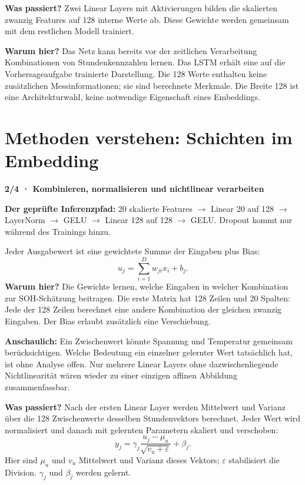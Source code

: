 \textbf{Was passiert?} Zwei Linear Layers mit Aktivierungen bilden die skalierten zwanzig Features auf 128 interne Werte ab. Diese Gewichte werden gemeinsam mit dem restlichen Modell trainiert.

\textbf{Warum hier?} Das Netz kann bereits vor der zeitlichen Verarbeitung Kombinationen von Stundenkennzahlen lernen. Das LSTM erhält eine auf die Vorhersageaufgabe trainierte Darstellung. Die 128 Werte enthalten keine zusätzlichen Messinformationen; sie sind berechnete Merkmale. Die Breite 128 ist eine Architekturwahl, keine notwendige Eigenschaft eines Embeddings.

\clearpage
\section*{\color{accent}Methoden verstehen: Schichten im Embedding}
\textbf{2/4 · Kombinieren, normalisieren und nichtlinear verarbeiten}

\textbf{Der geprüfte Inferenzpfad:} 20 skalierte Features $\rightarrow$ Linear 20 auf 128 $\rightarrow$ LayerNorm $\rightarrow$ GELU $\rightarrow$ Linear 128 auf 128 $\rightarrow$ GELU. Dropout kommt nur während des Trainings hinzu.

Jeder Ausgabewert ist eine gewichtete Summe der Eingaben plus Bias:
\[
u_j=\sum_{i=1}^{D}w_{ji}x_i+b_j.
\]
\textbf{Warum hier?} Die Gewichte lernen, welche Eingaben in welcher Kombination zur SOH-Schätzung beitragen. Die erste Matrix hat 128 Zeilen und 20 Spalten: Jede der 128 Zeilen berechnet eine andere Kombination der gleichen zwanzig Eingaben. Der Bias erlaubt zusätzlich eine Verschiebung.

\textbf{Anschaulich:} Ein Zwischenwert könnte Spannung und Temperatur gemeinsam berücksichtigen. Welche Bedeutung ein einzelner gelernter Wert tatsächlich hat, ist ohne Analyse offen. Nur mehrere Linear Layers ohne dazwischenliegende Nichtlinearität wären wieder zu einer einzigen affinen Abbildung zusammenfassbar.

\textbf{Was passiert?} Nach der ersten Linear Layer werden Mittelwert und Varianz über die 128 Zwischenwerte desselben Stundenvektors berechnet. Jeder Wert wird normalisiert und danach mit gelernten Parametern skaliert und verschoben:
\[
y_j=\gamma_j\frac{u_j-\mu_u}{\sqrt{v_u+\varepsilon}}+\beta_j.
\]
Hier sind $\mu_u$ und $v_u$ Mittelwert und Varianz dieses Vektors; $\varepsilon$ stabilisiert die Division. $\gamma_j$ und $\beta_j$ werden gelernt.

